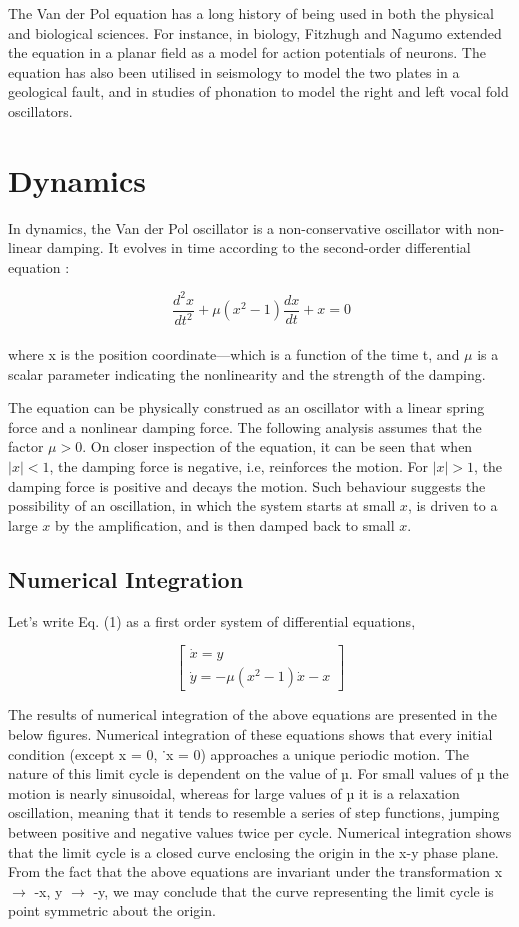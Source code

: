 \documentclass[12pt, a4paper]{report}
\begin{document}
The Van der Pol equation has a long history of being used in both the physical and biological sciences. For instance, in biology, Fitzhugh and Nagumo extended the equation in a planar field as a model for action potentials of neurons. The equation has also been utilised in seismology to model the two plates in a geological fault, and in studies of phonation to model the right and left vocal fold oscillators.

\chapter{Dynamics}
In dynamics, the Van der Pol oscillator is a non-conservative oscillator with non-linear damping. It evolves in time according to the second-order differential equation  :

\begin{equation}\
\frac{d^2 x}{dt^2}+\mu(x^2-1)\frac{dx}{dt}+x=0
\end{equation}\\

where x is the position coordinate—which is a function of the time t, and $\mu$ is a scalar parameter indicating the nonlinearity and the strength of the damping.

The equation can be physically construed as an oscillator with a linear spring force and a nonlinear damping force. The following analysis assumes that the factor $\mu >0$. On closer inspection of the equation, it can be seen that when $|x| <1$, the damping force is negative, i.e, reinforces the motion. For $|x| >1$, the damping force is positive and decays the motion. Such behaviour suggests the possibility of an oscillation, in which the system starts at small $x$, is driven to a large $x$ by the amplification, and is then damped back to small $x$.

\section{Numerical Integration}
Let’s write Eq. (1) as a first order system of differential equations,

\[
\begin{bmatrix}
\dot{x} = y \\
\dot{y} = -\mu(x^2-1)\dot{x}-x
\end{bmatrix}
\]

The results of numerical integration of the above equations are presented in the below figures. Numerical integration of these equations shows that every initial condition (except x = 0, ˙x = 0) approaches a unique periodic motion. The nature of this limit cycle is dependent on the value of µ. For small values of µ the motion is nearly sinusoidal, whereas for large values of µ it is a relaxation oscillation, meaning that it tends to resemble a series of step functions, jumping between positive and negative values twice per cycle. Numerical integration shows that the limit cycle is a closed curve enclosing the origin in the x-y phase plane. From the fact that the above equations are invariant under the transformation x $\rightarrow$ -x, y $\rightarrow$ -y, we may conclude that the curve representing the limit cycle is point symmetric about the origin. 
\end{document}
